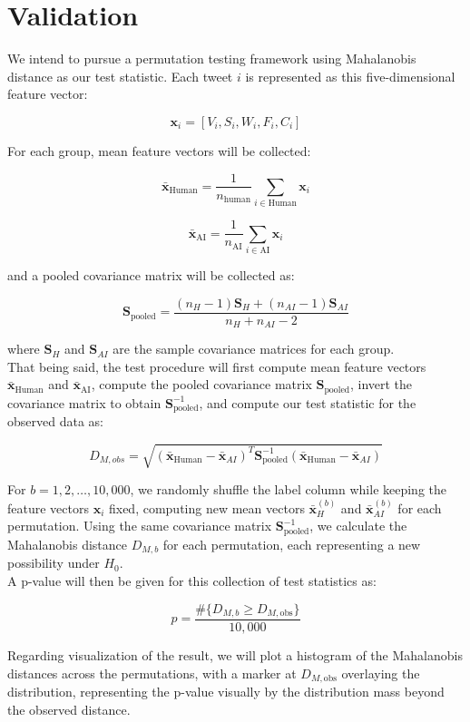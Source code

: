 \section*{Validation}


We intend to pursue a permutation testing framework using Mahalanobis distance as our test statistic. Each tweet $i$ is represented as this five-dimensional feature vector:

$$ \mathbf{x}_i = [V_i, S_i, W_i, F_i, C_i ] $$

For each group, mean feature vectors will be collected:

$$ \bar{\mathbf{x}}_{\text{Human}} = \frac{1}{n_\text{human}} \sum_{i \in \text{Human}} \mathbf{x}_i $$

$$ \bar{\mathbf{x}}_{\text{AI}} = \frac{1}{n_\text{AI}} \sum_{i \in \text{AI}} \mathbf{x}_i $$

and a pooled covariance matrix will be collected as:

$$
\mathbf{S}_{\text{pooled}} = \frac{(n_H - 1)\mathbf{S}_H + (n_{AI} - 1)\mathbf{S}_{AI}}{n_H + n_{AI} - 2}
$$

where $\mathbf{S}_H$ and $\mathbf{S}_{AI}$ are the sample covariance matrices for each group.\\

That being said, the test procedure will first compute mean feature vectors $ \bar{\mathbf{x}}_{\text{Human}} $ and $ \bar{\mathbf{x}}_{\text{AI}} $, compute the pooled covariance matrix $\mathbf{S}_{\text{pooled}}$, invert the covariance matrix to obtain $\mathbf{S}_{\text{pooled}}^{-1}$, and compute our test statistic for the observed data as:

$$ D_{M,obs} = \sqrt{(\bar{\mathbf{x}}_\text{Human} - \bar{\mathbf{x}}_{AI})^T \mathbf{S}_{\text{pooled}}^{-1} (\bar{\mathbf{x}}_\text{Human} - \bar{\mathbf{x}}_{AI})} $$

For $b = 1, 2, \ldots, 10,000$, we randomly shuffle the label column while keeping the feature vectors $\mathbf{x}_i$ fixed, computing new mean vectors $\bar{\mathbf{x}}_H^{(b)}$ and $\bar{\mathbf{x}}_{AI}^{(b)}$ for each permutation. Using the same covariance matrix $\mathbf{S}_{\text{pooled}}^{-1}$, we calculate the Mahalanobis distance $ D_{M, b} $ for each permutation, each representing a new possibility under $ H_0 $.\\

A p-value will then be given for this collection of test statistics as:

$$ p = \frac{\#\{D_{M,b} \geq D_{M,\text{obs}}\}}{10,000} $$

Regarding visualization of the result, we will plot a histogram of the Mahalanobis distances across the permutations, with a marker at $ D_{M,\text{obs}} $ overlaying the distribution, representing the p-value visually by the distribution mass beyond the observed distance.
